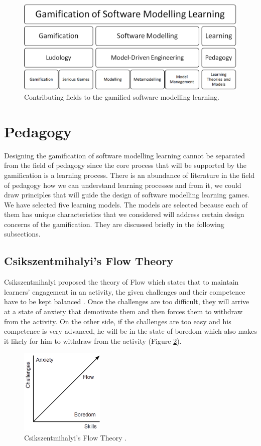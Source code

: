 \documentclass[12pt, a4paper]{report}
\begin{document}
\begin{figure}[ht]
\centering
\includegraphics[width=12cm]{smlg2}
\caption{Contributing fields to the gamified software modelling learning.}
\label{smlg2}
\end{figure}

\section{Pedagogy}
\label{Pedagogy}
Designing the gamification of software modelling learning cannot be separated from the field of pedagogy since the core process that will be supported by the gamification is a learning process. There is an abundance of literature in the field of pedagogy how we can understand learning processes and from it, we could draw principles that will guide the design of software modelling learning games. We have selected five learning models. The models are selected because each of them has unique characteristics that we considered will address certain design concerns of the gamification. They are discussed briefly in the following subsections.

\subsection{Csikszentmihalyi's Flow Theory}
Csikszentmihalyi proposed the theory of Flow which states that to maintain learners' engagement in an activity, the given challenges and their competence have to be kept balanced \cite{csikszentmihalyi2014toward}. Once the challenges are too difficult, they will arrive at a state of anxiety that demotivate them and then forces them to withdraw from the activity. On the other side, if the challenges are too easy and his competence is very advanced, he will be in the state of boredom which also makes it likely for him to withdraw from the activity (Figure \ref{flow-theory}).

\begin{figure}[ht]
\centering
\includegraphics[width=4cm]{flow-theory}
\caption{Csikszentmihalyi's Flow Theory \cite{csikszentmihalyi2014toward}.}
\label{flow-theory}
\end{figure}
 
\end{document}
